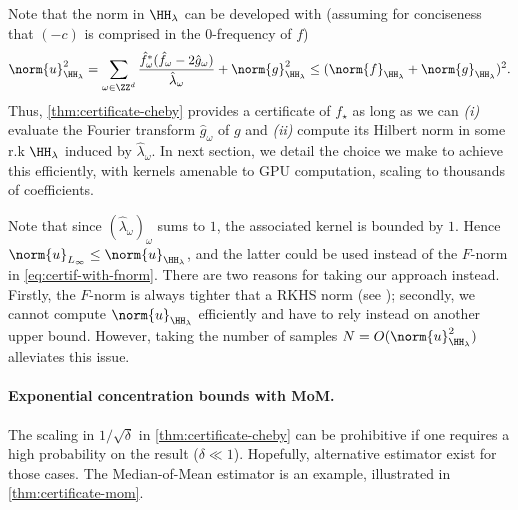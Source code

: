 \documentclass{article}
\begin{document}
Note that the norm in $\HH_\lambda$ can be developed with (assuming for conciseness that $(-c)$ is comprised in the $0$-frequency of $f$)
\begin{equation}
  \norm{u}_{\HH_\lambda}^2 = \sum_{\omega \in \ZZ^d} \frac{\hat{f}_\omega^* (\hat{f}_\omega - 2\hat{g}_\omega)}{\hat{\lambda}_\omega} + \norm{g}_{\HH_\lambda}^2 \leq (\norm{f}_{\HH_\lambda} + \norm{g}_{\HH_\lambda})^2.
\end{equation}
Thus, \cref{thm:certificate-cheby} provides a certificate of $f_\star$ as long as we can \emph{(i)} evaluate the Fourier transform $\hat{g}_\omega$ of $g$ and \emph{(ii)} compute its Hilbert norm in some r.k $\HH_\lambda$ induced by $\hat{\lambda}_\omega$. In next section, we detail the choice we make to achieve this efficiently, with kernels amenable to GPU computation, scaling to thousands of coefficients.

\begin{remark}
  Note that since $(\hat{\lambda}_\omega)_\omega$ sums to $1$, the associated kernel is bounded by $1$. Hence $\norm{u}_{L_\infty} \leq \norm{u}_{\HH_\lambda}$, and the latter could be used instead of the $F$-norm in \cref{eq:certif-with-fnorm}. There are two reasons for taking our approach instead. Firstly, the $F$-norm is always tighter that a RKHS norm (see \eg \cite[Lem. 4]{woodworthNonConvexOptimizationCertificates2022}); secondly, we cannot compute $\norm{u}_{\HH_\lambda}$ efficiently and have to rely instead on another upper bound. However, taking the number of samples $N = O(\norm{u}_{\HH_\lambda}^2)$ alleviates this issue.
\end{remark}

\paragraph{Exponential concentration bounds with MoM.}
The scaling in $1/\sqrt{\delta}$ in \cref{thm:certificate-cheby} can be prohibitive if one requires a high probability on the result ($\delta \ll 1$). Hopefully, alternative estimator exist for those cases. The Median-of-Mean estimator is an example, illustrated in \cref{thm:certificate-mom}.
\end{document}
